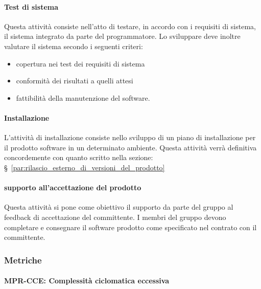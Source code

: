 \documentclass[../../norme-di-progetto.tex]{subfiles}
\begin{document}
\paragraph{Test di sistema}%
\label{par:test_sistema}
Questa attività consiste nell'atto di testare, in accordo con i requisiti di sistema, il sistema integrato da parte del programmatore.
Lo sviluppare deve inoltre valutare il sistema secondo i seguenti criteri:
\begin{itemize}
  \item copertura nei test dei requisiti di sistema
  \item conformità dei risultati a quelli attesi
  \item fattibilità della manutenzione del software.
\end{itemize}

\paragraph{Installazione}%
\label{par:installazione}
L'attività di installazione consiste nello sviluppo di un piano di installazione per il prodotto software in un determinato ambiente.
Questa attività verrà definitiva concordemente con quanto scritto nella sezione: §~\ref{par:rilascio_esterno_di_versioni_del_prodotto}

\paragraph{supporto all'accettazione del prodotto}%
\label{par:supporto_accettazione_prodotto}
Questa attività si pone come obiettivo il supporto da parte del gruppo al feedback di accettazione del committente.
I membri del gruppo devono completare e consegnare il software prodotto come specificato nel contrato con il committente.

\subsubsection{Metriche}%
\label{subs:sviluppo/metriche}


\paragraph{MPR-CCE: Complessità ciclomatica eccessiva}%
\label{par:MPR-CCE_complessita_ciclomatica_eccessiva}
\end{document}
